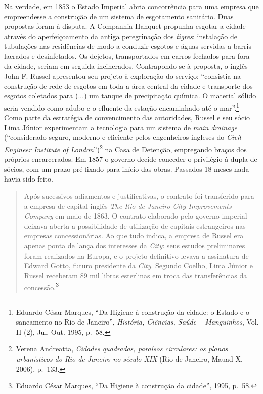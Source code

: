 Na verdade, em 1853 o Estado Imperial abria concorrência para uma
empresa que empreendesse a construção de um sistema de esgotamento
sanitário. Duas propostas foram à disputa. A Companhia Hanquet propunha
esgotar a cidade através do aperfeiçoamento da antiga peregrinação dos
\emph{tigres}: instalação de tubulações nas residências de modo a
conduzir esgotos e águas servidas a barris lacrados e desinfetados. Os
dejetos, transportados em carros fechados para fora da cidade, seriam em
seguida incinerados. Contrapondo-se à proposta, o inglês John F. Russel
apresentou seu projeto à exploração do serviço: ``consistia na
construção de rede de esgotos em toda a área central da cidade e
transporte dos esgotos coletados para (...) um tanque de precipitação
química. O material sólido seria vendido como adubo e o efluente da
estação encaminhado até o mar''.\footnote{Eduardo César Marques, ``Da
  Higiene à construção da cidade: o Estado e o saneamento no Rio de
  Janeiro'', \emph{História, Ciências, Saúde -- Manguinhos}, Vol. II
  (2), Jul.-Out. 1995, p.~58.} Como parte da estratégia de convencimento
das autoridades, Russel e seu sócio Lima Júnior experimentam a
tecnologia para um sistema de \emph{main drainage} (``considerado
seguro, moderno e eficiente pelos engenheiros ingleses do \emph{Civil
Engineer Institute of London}'')\footnote{Verena Andreatta,
  \emph{Cidades quadradas, paraísos circulares: os planos urbanísticos
  do Rio de Janeiro no século XIX} (Rio de Janeiro, Mauad X, 2006),
  p.~133.} na Casa de Detenção, empregando braços dos próprios
encarcerados. Em 1857 o governo decide conceder o privilégio à dupla de
sócios, com um prazo pré-fixado para início das obras. Passados 18 meses
nada havia sido feito.

\begin{quote}
Após sucessivos adiamentos e justificativas, o contrato foi transferido
para a empresa de capital inglês \emph{The Rio de Janeiro City
Improvements Company} em maio de 1863. O contrato elaborado pelo governo
imperial deixava aberta a possibilidade de utilização de capitais
estrangeiros nas empresas concessionárias. Ao que tudo indica, a empresa
de Russel era apenas ponta de lança dos interesses da \emph{City}: seus
estudos preliminares foram realizados na Europa, e o projeto definitivo
levava a assinatura de Edward Gotto, futuro presidente da \emph{City}.
Segundo Coelho, Lima Júnior e Russel receberam 89 mil libras esterlinas
em troca das transferências da concessão.\footnote{Eduardo César
  Marques, ``Da Higiene à construção da cidade'', 1995, p.~58.}
\end{quote}


